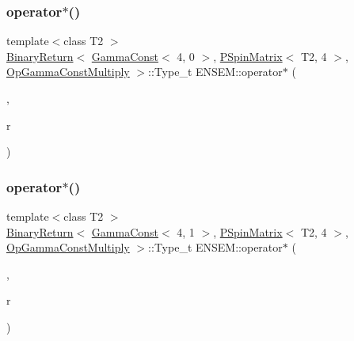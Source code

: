 \subsubsection{\texorpdfstring{operator$\ast$()}{operator*()}\hspace{0.1cm}{\footnotesize\ttfamily [1/64]}}
{\footnotesize\ttfamily template$<$class T2 $>$ \\
\mbox{\hyperlink{structENSEM_1_1BinaryReturn}{Binary\+Return}}$<$ \mbox{\hyperlink{classENSEM_1_1GammaConst}{Gamma\+Const}}$<$ 4, 0 $>$, \mbox{\hyperlink{classENSEM_1_1PSpinMatrix}{P\+Spin\+Matrix}}$<$ T2, 4 $>$, \mbox{\hyperlink{structENSEM_1_1OpGammaConstMultiply}{Op\+Gamma\+Const\+Multiply}} $>$\+::Type\+\_\+t E\+N\+S\+E\+M\+::operator$\ast$ (\begin{DoxyParamCaption}\item[{const \mbox{\hyperlink{classENSEM_1_1GammaConst}{Gamma\+Const}}$<$ 4, 0 $>$ \&}]{,  }\item[{const \mbox{\hyperlink{classENSEM_1_1PSpinMatrix}{P\+Spin\+Matrix}}$<$ T2, 4 $>$ \&}]{r }\end{DoxyParamCaption})\hspace{0.3cm}{\ttfamily [inline]}}

\mbox{\label{group__primspinmatrix_gafa6af9df04bb90ce7675e5c8f4b13ac8}} 
\subsubsection{\texorpdfstring{operator$\ast$()}{operator*()}\hspace{0.1cm}{\footnotesize\ttfamily [2/64]}}
{\footnotesize\ttfamily template$<$class T2 $>$ \\
\mbox{\hyperlink{structENSEM_1_1BinaryReturn}{Binary\+Return}}$<$ \mbox{\hyperlink{classENSEM_1_1GammaConst}{Gamma\+Const}}$<$ 4, 1 $>$, \mbox{\hyperlink{classENSEM_1_1PSpinMatrix}{P\+Spin\+Matrix}}$<$ T2, 4 $>$, \mbox{\hyperlink{structENSEM_1_1OpGammaConstMultiply}{Op\+Gamma\+Const\+Multiply}} $>$\+::Type\+\_\+t E\+N\+S\+E\+M\+::operator$\ast$ (\begin{DoxyParamCaption}\item[{const \mbox{\hyperlink{classENSEM_1_1GammaConst}{Gamma\+Const}}$<$ 4, 1 $>$ \&}]{,  }\item[{const \mbox{\hyperlink{classENSEM_1_1PSpinMatrix}{P\+Spin\+Matrix}}$<$ T2, 4 $>$ \&}]{r }\end{DoxyParamCaption})\hspace{0.3cm}{\ttfamily [inline]}}

